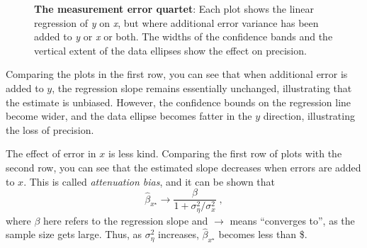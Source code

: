 \documentclass[
  letterpaper,
  10pt,
  krantz2]{krantz}
\begin{document}
{\begin{figure}[H]


\caption{\label{fig-measerr-demo}\textbf{The measurement error quartet}:
Each plot shows the linear regression of \emph{y} on \emph{x}, but where
additional error variance has been added to \emph{y} or \emph{x} or
both. The widths of the confidence bands and the vertical extent of the
data ellipses show the effect on precision.}

\end{figure}%

Comparing the plots in the first row, you can see that when additional
error is added to \(y\), the regression slope remains essentially
unchanged, illustrating that the estimate is unbiased. However, the
confidence bounds on the regression line become wider, and the data
ellipse becomes fatter in the \(y\) direction, illustrating the loss of
precision.

The effect of error in \(x\) is less kind. Comparing the first row of
plots with the second row, you can see that the estimated slope
decreases when errors are added to \(x\). This is called
\emph{attenuation bias}, and it can be shown that \[
\widehat{\beta}_{x^\star} \longrightarrow \frac{\beta}{1+\sigma^2_\eta /\sigma^2_x} \; ,
\] where \(\beta\) here refers to the regression slope and
\(\longrightarrow\) means ``converges to'', as the sample size gets
large. Thus, as \(\sigma^2_\eta\) increases,
\(\widehat{\beta}_{x^\star}\) becomes less than \beta\$.

}
\end{document}
